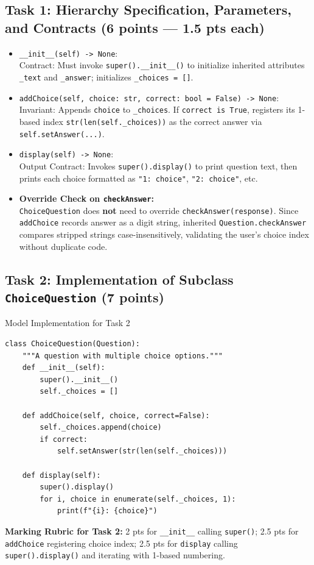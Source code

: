 \documentclass[11pt,a4paper]{article}
\begin{document}
\subsection*{Task 1: Hierarchy Specification, Parameters, and Contracts (6 points --- 1.5 pts each)}
\begin{itemize}[itemsep=1.5pt]
\item \texttt{\_\_init\_\_(self) -> None}:\\
  Contract: Must invoke \texttt{super().\_\_init\_\_()} to initialize inherited attributes \texttt{\_text} and \texttt{\_answer}; initializes \texttt{\_choices = []}.
\item \texttt{addChoice(self, choice: str, correct: bool = False) -> None}:\\
  Invariant: Appends \texttt{choice} to \texttt{\_choices}. If \texttt{correct is True}, registers its 1-based index \texttt{str(len(self.\_choices))} as the correct answer via \texttt{self.setAnswer(...)}.
\item \texttt{display(self) -> None}:\\
  Output Contract: Invokes \texttt{super().display()} to print question text, then prints each choice formatted as \texttt{"1: choice"}, \texttt{"2: choice"}, etc.
\item \textbf{Override Check on \texttt{checkAnswer}:}\\
  \texttt{ChoiceQuestion} does \textbf{not} need to override \texttt{checkAnswer(response)}. Since \texttt{addChoice} records answer as a digit string, inherited \texttt{Question.checkAnswer} compares stripped strings case-insensitively, validating the user's choice index without duplicate code.
\end{itemize}

\subsection*{Task 2: Implementation of Subclass \texttt{ChoiceQuestion} (7 points)}
\begin{solbox}{Model Implementation for Task 2}
\begin{lstlisting}
class ChoiceQuestion(Question):
    """A question with multiple choice options."""
    def __init__(self):
        super().__init__()
        self._choices = []

    def addChoice(self, choice, correct=False):
        self._choices.append(choice)
        if correct:
            self.setAnswer(str(len(self._choices)))

    def display(self):
        super().display()
        for i, choice in enumerate(self._choices, 1):
            print(f"{i}: {choice}")
\end{lstlisting}
\end{solbox}
\textbf{Marking Rubric for Task 2:} 2 pts for \texttt{\_\_init\_\_} calling \texttt{super()}; 2.5 pts for \texttt{addChoice} registering choice index; 2.5 pts for \texttt{display} calling \texttt{super().display()} and iterating with 1-based numbering.
\end{document}
